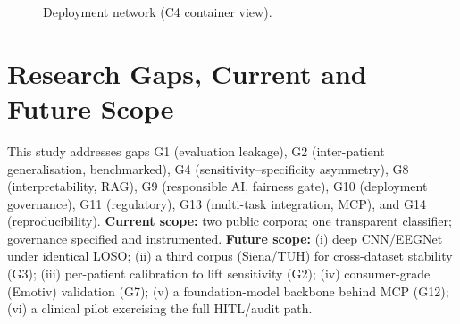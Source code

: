 \documentclass[10pt,journal,twocolumn]{IEEEtran}
\begin{document}
\begin{figure}[h]\centering
{}
\caption{Deployment network (C4 container view).}\label{fig:net}\end{figure}

\section{Research Gaps, Current and Future Scope}
This study addresses gaps G1 (evaluation leakage), G2 (inter-patient generalisation, benchmarked), G4 (sensitivity--specificity asymmetry), G8 (interpretability, RAG), G9 (responsible AI, fairness gate), G10 (deployment governance), G11 (regulatory), G13 (multi-task integration, MCP), and G14 (reproducibility). \textbf{Current scope:} two public corpora; one transparent classifier; governance specified and instrumented. \textbf{Future scope:} (i) deep CNN/EEGNet under identical LOSO; (ii) a third corpus (Siena/TUH) for cross-dataset stability (G3); (iii) per-patient calibration to lift sensitivity (G2); (iv) consumer-grade (Emotiv) validation (G7); (v) a foundation-model backbone behind MCP (G12); (vi) a clinical pilot exercising the full HITL/audit path.
\end{document}
